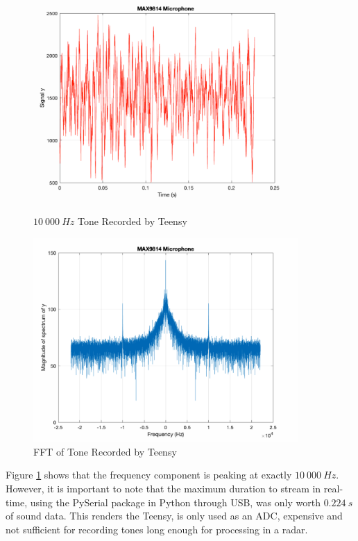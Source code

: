 \begin{figure}[h!]
    \centering
    \begin{minipage}{0.45\textwidth}
        \centering
        \includegraphics[width=0.9\textwidth]{images/soundTeensy.pdf}
        \caption{$10\ 000\ Hz$ Tone Recorded by Teensy}\label{fig:soundTeensy}
    \end{minipage}\hfill
    \begin{minipage}{0.45\textwidth}
        \centering
        \includegraphics[width=0.9\textwidth]{images/fftTeensy.pdf}
        \caption{FFT of Tone Recorded by Teensy}\label{fig:fftTeensy}
    \end{minipage}
\end{figure}

Figure \ref{fig:fftTeensy} shows that the frequency component is peaking at exactly $10\ 000\ Hz$. However, it is important to note that the maximum duration to stream in real-time, using the PySerial package in Python through USB, was only worth $0.224\ s$ of sound data. This renders the Teensy, is only used as an ADC, expensive and not sufficient for recording tones long enough for processing in a radar.

